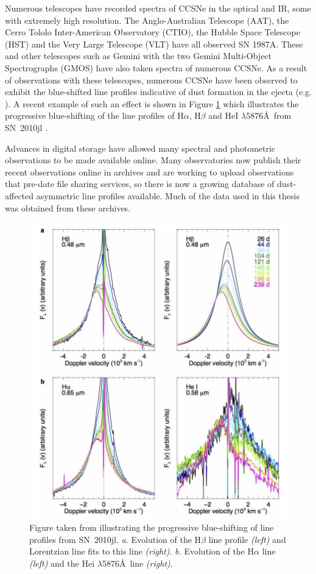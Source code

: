 Numerous telescopes have recorded spectra of CCSNe in the optical and IR, some with extremely high resolution.  The Anglo-Australian Telescope (AAT), the Cerro Tololo Inter-American Observatory (CTIO), the Hubble Space Telescope (HST) and the Very Large Telescope (VLT) have all observed SN 1987A.  These and other telescopes such as Gemini with the two Gemini Multi-Object Spectrographs (GMOS) have also taken spectra of numerous CCSNe.  As a result of observations with these telescopes, numerous CCSNe have been observed to exhibit the blue-shifted line profiles indicative of dust formation in the ejecta (e.g. \citet{Lucy1989,Fabbri2011,Mauerhan2012,Milisavljevic2012}).  A recent example of such an effect is shown in Figure \ref{fig:2010jl} which illustrates the progressive blue-shifting of the line profiles of H$\alpha$, H$\beta$ and  HeI $\lambda$5876\AA\ from SN~2010jl \citep{Gall2014}.

Advances in digital storage have allowed many spectral and photometric observations to be made  available online.  Many observatories now publish their recent observations online in archives and are working to upload observations that pre-date file sharing services, so there is now a growing database of dust-affected asymmetric line profiles  available. Much of the data used in this thesis was obtained from these archives.
\begin{figure}[!t]
\centering
\includegraphics[clip=true,scale=0.4,trim= 0 -20 0 -20]{chapters/chapter1/figs/2010jl.png}
\caption{Figure taken from \citet{Gall2014} illustrating the progressive blue-shifting of line profiles from SN~2010jl.  {\em a.} Evolution of the H$\beta$ line profile {\em (left)} and Lorentzian line fits to this line {\em (right)}. {\em b.} Evolution of the H$\alpha$ line {\em (left)} and the He{\sc i} $\lambda$5876\AA\ line {\em (right)}.}
\label{fig:2010jl}
\end{figure}


